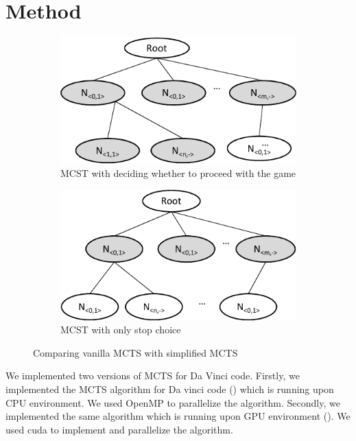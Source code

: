 
\section{Method}

\begin{figure}
\begin{subfigure}[b]{0.95\columnwidth}
\includegraphics [width=0.95\columnwidth]{figures/sub_guess_1.pdf}
\caption{MCST with deciding whether to proceed with the game }
\label{fig:proceed_game}
\end{subfigure}
\par\bigskip
\begin{subfigure}[b]{0.95\columnwidth}
\includegraphics [width=0.95\columnwidth]{figures/sub_guess_2.pdf}
\caption{MCST with only stop choice}
\label{fig:stop_game}
\end{subfigure}
\caption{Comparing vanilla MCTS with simplified MCTS}
\end{figure}


We implemented two versions of MCTS for Da Vinci code. 
Firstly, we implemented the MCTS algorithm for Da vinci code (\cpu) which is running upon CPU environment.
We used OpenMP to parallelize the algorithm.
Secondly, we implemented the same algorithm which is running upon GPU environment (\gpu).
We used cuda to implement and parallelize the algorithm.

